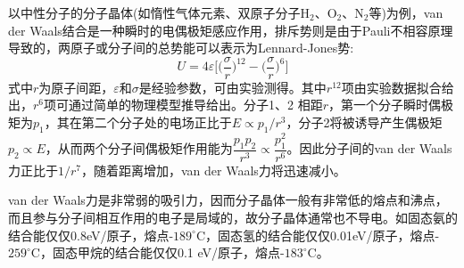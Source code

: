 以中性分子的分子晶体(如惰性气体元素、双原子分子$\mathrm{H}_2$、$\mathrm{O}_2$、$\mathrm{N}_2$等)为例，van der Waals结合是一种瞬时的电偶极矩感应作用，排斥势则是由于Pauli不相容原理导致的，两原子或分子间的总势能可以表示为Lennard-Jones势:
\begin{equation}
	U=4\varepsilon\bigg[\big(\dfrac{\sigma}r\big)^{12}-\big(\dfrac{\sigma}r\big)^6\bigg]
	\label{eq:SSI-04}
\end{equation}
式中$r$为原子间距，$\varepsilon$和$\sigma$是经验参数，可由实验测得。其中$r^{12}$项由实验数据拟合给出，$r^6$项可通过简单的物理模型推导给出。分子1、2 相距$r$，第一个分子瞬时偶极矩为$p_1$，其在第二个分子处的电场正比于$E\propto p_1/r^3$，分子2将被诱导产生偶极矩$p_2\propto E$，从而两个分子间偶极矩作用能为$\dfrac{p_1p_2}{r^3}\propto\dfrac{p_1^2}{r^6}$。因此分子间的van der Waals力正比于$1/r^7$，随着距离增加，van der Waals力将迅速减小。

van der Waals力是非常弱的吸引力，因而分子晶体一般有非常低的熔点和沸点，而且参与分子间相互作用的电子是局域的，故分子晶体通常也不导电。如固态氨的结合能仅仅0.8eV/原子，熔点-$189^{\circ}\mathrm{C}$，固态氢的结合能仅仅0.01eV/原子，熔点-$259^{\circ}\mathrm{C}$，固态甲烷的结合能仅仅0.1 eV/原子，熔点-$183^{\circ}\mathrm{C}$。

